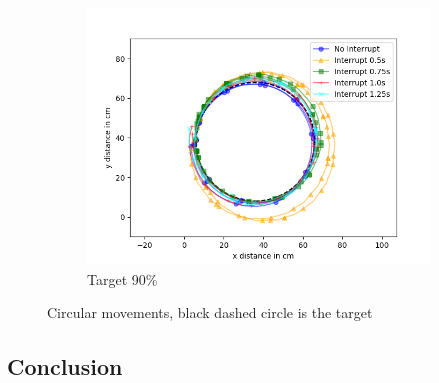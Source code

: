 \begin{figure}
\begin{subfigure}[b]{0.62\textwidth}
		\includegraphics[width=\textwidth]{pics/circle_90.png}
		\caption{Target 90\%}
		\label{fig:circ_exp3}
	\end{subfigure}
	\caption{Circular movements, black dashed circle is the target}
\end{figure}


\subsection{Conclusion}









